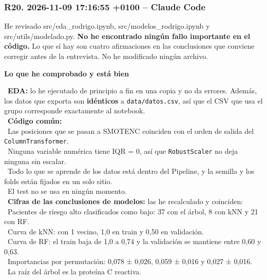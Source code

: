 \documentclass[11pt,a4paper]{article}
\begin{document}
\subsubsection*{R20. 2026-11-09 17:16:55 +0100 -- Claude Code}
{\small
He revisado src/\allowbreak{}eda\_\allowbreak{}rodrigo.ipynb, src/\allowbreak{}modelos\_\allowbreak{}rodrigo.ipynb y src/\allowbreak{}utils/\allowbreak{}modelado.py. \textbf{No he encontrado ningún fallo importante en el código.} Lo que sí hay son cuatro afirmaciones en las conclusiones que conviene corregir antes de la entrevista. No he modificado ningún archivo.

\smallskip\noindent\textbf{Lo que he comprobado y está bien}\par
\hspace*{1.0em}\textbullet~\textbf{EDA:} lo he ejecutado de principio a fin en una copia y no da errores. Además, los datos que exporta son \textbf{idénticos} a \texttt{data/\allowbreak{}datos.csv}, así que el CSV que usa el grupo corresponde exactamente al notebook. \\{}
\hspace*{1.0em}\textbullet~\textbf{Código común:} \\{}
\hspace*{2.0em}\textbullet~Las posiciones que se pasan a SMOTENC coinciden con el orden de salida del \texttt{ColumnTransformer}. \\{}
\hspace*{2.0em}\textbullet~Ninguna variable numérica tiene IQR = 0, así que \texttt{RobustScaler} no deja ninguna sin escalar. \\{}
\hspace*{2.0em}\textbullet~Todo lo que se aprende de los datos está dentro del Pipeline, y la semilla y los folds están fijados en un solo sitio. \\{}
\hspace*{2.0em}\textbullet~El test no se usa en ningún momento. \\{}
\hspace*{1.0em}\textbullet~\textbf{Cifras de las conclusiones de modelos:} las he recalculado y coinciden: \\{}
\hspace*{2.0em}\textbullet~Pacientes de riesgo alto clasificados como bajo: 37 con el árbol, 8 con kNN y 21 con RF. \\{}
\hspace*{2.0em}\textbullet~Curva de kNN: con 1 vecino, 1,0 en train y 0,50 en validación. \\{}
\hspace*{2.0em}\textbullet~Curva de RF: el train baja de 1,0 a 0,74 y la validación se mantiene entre 0,60 y 0,63. \\{}
\hspace*{2.0em}\textbullet~Importancias por permutación: 0,078 ± 0,026, 0,059 ± 0,016 y 0,027 ± 0,016. \\{}
\hspace*{2.0em}\textbullet~La raíz del árbol es la proteína C reactiva.

}
\end{document}

